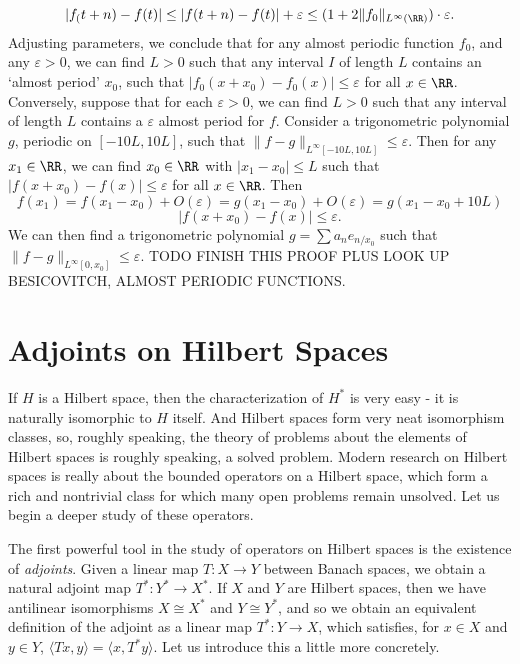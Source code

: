 \begin{example}
    \[ |f_(t + n) - f(t)| \leq |f(t + n) - f(t)| + \varepsilon \leq (1 + 2\| f_0 \|_{L^\infty(\RR)}) \cdot \varepsilon. \]
    Adjusting parameters, we conclude that for any almost periodic function $f_0$, and any $\varepsilon > 0$, we can find $L > 0$ such that any interval $I$ of length $L$ contains an `almost period' $x_0$, such that $|f_0(x + x_0) - f_0(x)| \leq \varepsilon$ for all $x \in \RR$. Conversely, suppose that for each $\varepsilon > 0$, we can find $L > 0$ such that any interval of length $L$ contains a $\varepsilon$ almost period for $f$. Consider a trigonometric polynomial $g$, periodic on $[-10L,10L]$, such that $\| f - g \|_{L^\infty[-10L,10L]} \leq \varepsilon$. Then for any $x_1 \in \RR$, we can find $x_0 \in \RR$ with $|x_1 - x_0| \leq L$ such that $|f(x + x_0) - f(x)| \leq \varepsilon$ for all $x \in \RR$. Then
    \[ f(x_1) = f(x_1 - x_0) + O(\varepsilon) = g(x_1 - x_0) + O(\varepsilon) = g(x_1 - x_0 + 10L) \]
    \[ |f(x + x_0) - f(x)| \leq \varepsilon. \]
    We can then find a trigonometric polynomial $g = \sum a_n e_{n/x_0}$ such that $\| f - g \|_{L^\infty[0,x_0]} \leq \varepsilon$. TODO FINISH THIS PROOF PLUS LOOK UP BESICOVITCH, ALMOST PERIODIC FUNCTIONS.
\end{example}



\section{Adjoints on Hilbert Spaces}

If $H$ is a Hilbert space, then the characterization of $H^*$ is very easy - it is naturally isomorphic to $H$ itself. And Hilbert spaces form very neat isomorphism classes, so, roughly speaking, the theory of problems about the elements of Hilbert spaces is roughly speaking, a solved problem. Modern research on Hilbert spaces is really about the bounded operators on a Hilbert space, which form a rich and nontrivial class for which many open problems remain unsolved. Let us begin a deeper study of these operators.

The first powerful tool in the study of operators on Hilbert spaces is the existence of \emph{adjoints}. Given a linear map $T: X \to Y$ between Banach spaces, we obtain a natural adjoint map $T^*: Y^* \to X^*$. If $X$ and $Y$ are Hilbert spaces, then we have antilinear isomorphisms $X \cong X^*$ and $Y \cong Y^*$, and so we obtain an equivalent definition of the adjoint as a linear map $T^*: Y \to X$, which satisfies, for $x \in X$ and $y \in Y$, $\langle Tx, y \rangle = \langle x, T^* y \rangle$. Let us introduce this a little more concretely.

